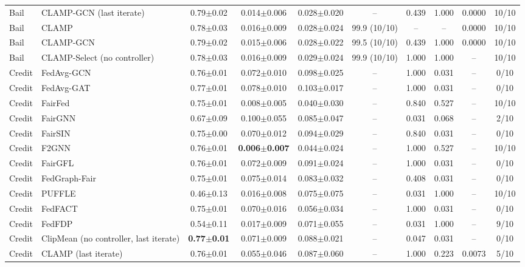 \begin{table}[tbp]
{\begin{tabular}{llcccccccc}
Bail & CLAMP-GCN (last iterate) & 0.79$\pm$0.02 & 0.014$\pm$0.006 & 0.028$\pm$0.020 & -- & 0.439 & 1.000 & 0.0000 & 10/10 \\
Bail & CLAMP & 0.78$\pm$0.03 & 0.016$\pm$0.009 & 0.028$\pm$0.024 & 99.9 (10/10) & -- & -- & 0.0000 & 10/10 \\
Bail & CLAMP-GCN & 0.79$\pm$0.02 & 0.015$\pm$0.006 & 0.028$\pm$0.022 & 99.5 (10/10) & 0.439 & 1.000 & 0.0000 & 10/10 \\
Bail & CLAMP-Select (no controller) & 0.78$\pm$0.03 & 0.016$\pm$0.009 & 0.029$\pm$0.024 & 99.9 (10/10) & 1.000 & 1.000 & -- & 10/10 \\
Credit & FedAvg-GCN & 0.76$\pm$0.01 & 0.072$\pm$0.010 & 0.098$\pm$0.025 & -- & 1.000 & 0.031 & -- & 0/10 \\
Credit & FedAvg-GAT & 0.77$\pm$0.01 & 0.078$\pm$0.010 & 0.103$\pm$0.017 & -- & 1.000 & 0.031 & -- & 0/10 \\
Credit & FairFed & 0.75$\pm$0.01 & 0.008$\pm$0.005 & 0.040$\pm$0.030 & -- & 0.840 & 0.527 & -- & 10/10 \\
Credit & FairGNN & 0.67$\pm$0.09 & 0.100$\pm$0.055 & 0.085$\pm$0.047 & -- & 0.031 & 0.068 & -- & 2/10 \\
Credit & FairSIN & 0.75$\pm$0.00 & 0.070$\pm$0.012 & 0.094$\pm$0.029 & -- & 0.840 & 0.031 & -- & 0/10 \\
Credit & F2GNN & 0.76$\pm$0.01 & \textbf{0.006$\pm$0.007} & 0.044$\pm$0.024 & -- & 1.000 & 0.527 & -- & 10/10 \\
Credit & FairGFL & 0.76$\pm$0.01 & 0.072$\pm$0.009 & 0.091$\pm$0.024 & -- & 1.000 & 0.031 & -- & 0/10 \\
Credit & FedGraph-Fair & 0.75$\pm$0.01 & 0.075$\pm$0.014 & 0.083$\pm$0.032 & -- & 0.408 & 0.031 & -- & 0/10 \\
Credit & PUFFLE & 0.46$\pm$0.13 & 0.016$\pm$0.008 & 0.075$\pm$0.075 & -- & 0.031 & 1.000 & -- & 10/10 \\
Credit & FedFACT & 0.75$\pm$0.01 & 0.070$\pm$0.016 & 0.056$\pm$0.034 & -- & 1.000 & 0.031 & -- & 0/10 \\
Credit & FedFDP & 0.54$\pm$0.11 & 0.017$\pm$0.009 & 0.071$\pm$0.055 & -- & 0.031 & 1.000 & -- & 9/10 \\
Credit & ClipMean (no controller, last iterate) & \textbf{0.77$\pm$0.01} & 0.071$\pm$0.009 & 0.088$\pm$0.021 & -- & 0.047 & 0.031 & -- & 0/10 \\
Credit & CLAMP (last iterate) & 0.76$\pm$0.01 & 0.055$\pm$0.046 & 0.087$\pm$0.060 & -- & 1.000 & 0.223 & 0.0073 & 5/10 \\

\end{tabular}}
\end{table}
